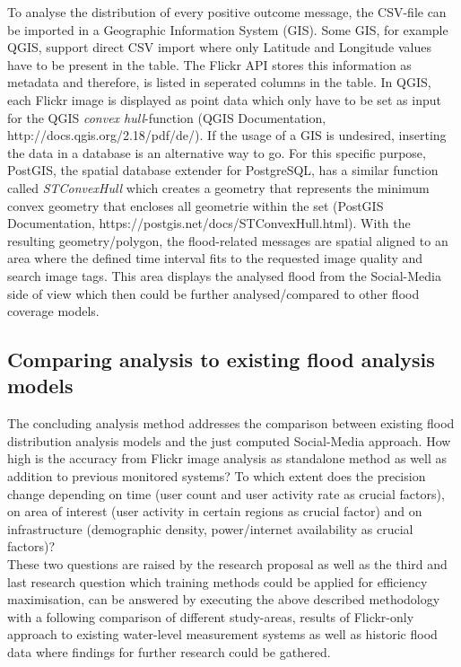 To analyse the distribution of every positive outcome message, the CSV-file can be imported in a Geographic Information System (GIS). Some GIS, for example QGIS, support direct CSV import where only Latitude and Longitude values have to be present in the table. The Flickr API stores this information as metadata and therefore, is listed in seperated columns in the table. In QGIS, each Flickr image is displayed as point data which only have to be set as input for the QGIS \emph{convex hull}-function (QGIS Documentation, http://docs.qgis.org/2.18/pdf/de/). If the usage of a GIS is undesired, inserting the data in a database is an alternative way to go. For this specific purpose, PostGIS, the spatial database extender for PostgreSQL, has a similar function called \emph{ST\textunderscore ConvexHull} which creates a geometry that represents the minimum convex geometry that encloses all geometrie within the set (PostGIS Documentation, https://postgis.net/docs/ST\textunderscore ConvexHull.html). With the resulting geometry/polygon, the flood-related messages are spatial aligned to an area where the defined time interval fits to the requested image quality and search image tags. This area displays the analysed flood from the Social-Media side of view which then could be further analysed/compared to other flood coverage models.
\subsection{Comparing analysis to existing flood analysis models}
The concluding analysis method addresses the comparison between existing flood distribution analysis models and the just computed Social-Media approach. How high is the accuracy from Flickr image analysis as standalone method as well as addition to previous monitored systems? To which extent does the precision change depending on time (user count and user activity rate as crucial factors), on area of interest (user activity in certain regions as crucial factor) and on infrastructure (demographic density, power/internet availability as crucial factors)? \\
These two questions are raised by the research proposal as well as the third and last research question which training methods could be applied for efficiency maximisation, can be answered by executing the above described methodology with a following comparison of different study-areas, results of Flickr-only approach to existing water-level measurement systems as well as historic flood data where findings for further research could be gathered.